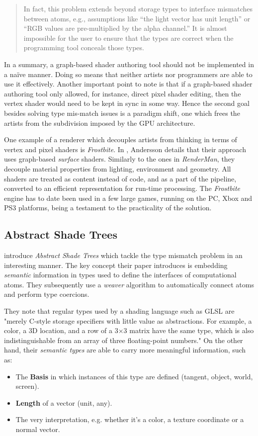 \begin{quote}
In fact, this problem extends beyond storage types to interface mismatches between atoms, e.g., assumptions like “the light vector has unit length” or “RGB values are pre-multiplied by the alpha channel.” It is almost impossible for the user to ensure that the types are correct when the programming tool conceals those types. 
\end{quote}

In a summary, a graph-based shader authoring tool should not be implemented in a naïve manner. Doing so means that neither artists nor programmers are able to use it effectively. Another important point to note is that if a graph-based shader authoring tool only allowed, for instance, direct pixel shader editing, then the vertex shader would need to be kept in sync in some way. Hence the second goal besides solving type mis-match issues is a paradigm shift, one which frees the artists from the subdivision imposed by the GPU architecture.

One example of a renderer which decouples artists from thinking in terms of vertex and pixel shaders is \emph{Frostbite}. In \cite{AT07}, Andersson details that their approach uses graph-based \emph{surface} shaders. Similarly to the ones in \emph{RenderMan}, they decouple material properties from lighting, environment and geometry. All shaders are treated as content instead of code, and as a part of the pipeline, converted to an efficient representation for run-time processing. The \emph{Frostbite} engine has to date been used in a few large games, running on the PC, Xbox and PS3 platforms, being a testament to the practicality of the solution.

\subsection{Abstract Shade Trees}

\citet{mcguire2006shadetrees} introduce \emph{Abstract Shade Trees} which tackle the type mismatch problem \cite{AbramWhitted90} in an interesting manner. The key concept their paper introduces is embedding \emph{semantic} information in types used to define the interfaces of computational atoms. They subsequently use a \emph{weaver} algorithm to automatically connect atoms and perform type coercions.

They note that regular types used by a shading language such as GLSL are "merely C-style storage specifiers with little value as abstractions. For example, a color, a 3D location, and a row of a 3×3 matrix have the same type, which is also indistinguishable from an array of three floating-point numbers." On the other hand, their \emph{semantic types} are able to carry more meaningful information, such as:
\begin{itemize}
\item The \textbf{Basis} in which instances of this type are defined (tangent, object, world, screen).
\item \textbf{Length} of a vector (unit, any).
\item The very interpretation, e.g. whether it's a color, a texture coordinate or a normal vector.
\end{itemize}

